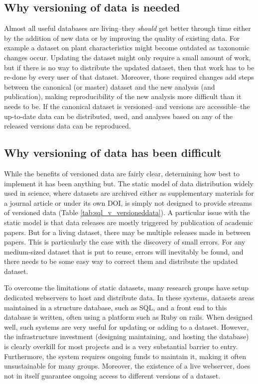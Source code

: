 \documentclass[a4paper,11pt]{article}
\begin{document}
\subsection{Why versioning of data is needed}

Almost all useful databases are living--they \emph{should} get better
through time either by the addition of new data or by improving the
quality of existing data. For example a dataset on plant characteristics
might become outdated as taxonomic changes occur. Updating the dataset might only
require a small amount of work, but if there is no
way to distribute the updated dataset, then that work has to be re-done by
every user of that dataset. Moreover, those required changes add steps
between the canonical (or master) dataset and the new analysis (and publication),
making reproducibility of the new analysis more difficult than it needs
to be. If the canonical dataset is versioned--and versions are
accessible--the up-to-date data can be distributed, used, and analyses
based on any of the released versions data can be reproduced.

\subsection{Why versioning of data has been difficult}

While the benefits of versioned data are fairly clear, determining how best to implement it has been anything but. The static model of data distribution widely used in science, where datasets are archived either as supplementary materials for a journal article
or under its own DOI, is simply not designed to provide streams of versioned
data (Table \ref{tab:sql_v_versioneddata}). A particular issue with the static
model is that data releases are mostly triggered by publication of academic
papers. But for a living dataset, there may be multiple releases made in
between papers. This is particularly the case with the discovery of small
errors. For any medium-sized dataset that is put to reuse, errors will
inevitably be found, and there needs to be some easy  way to correct them and
distribute the updated dataset.

To overcome the limitations of static datasets, many research groups have
setup dedicated webservers to host and distribute data. In these systems,
datasets areas maintained in a structure database, such as SQL, and a front
end to this database is written, often using a platform such as Ruby on rails.
When designed well, such systems are very useful for updating or adding to a
dataset. However, the infrastructure investment (designing maintaining, and
hosting the database) is clearly overkill for most projects and is a very
substantial barrier to entry. Furthermore, the system requires ongoing funds to maintain it, making it often unsustainable for many groups. Moreover, the existence of a live webserver,
does not in itself guarantee ongoing access to different versions of a
dataset.
\end{document}
